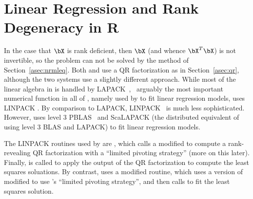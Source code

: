 \chapter{Linear Regression and Rank Degeneracy in R}

In the case that $\bX$ is rank deficient, then $\bX$ (and whence $\bX^T\bX$) is not invertible, so the problem can not be solved by the method of Section~\ref{asec:nrmleq}.  Both  and
 use a QR factorization as in Section~\ref{asec:qr}, although the two systems use a slightly different approach.  While most of the linear algebra in  is handled by
LAPACK~\citep{lug},~ arguably the most important numerical function in all of , namely  used by  to fit linear regression models, uses LINPACK \citep{linpack}.  By comparison to LAPACK,
LINPACK~ is much less sophisticated.  However,
 uses level 3
PBLAS~ and ScaLAPACK (the distributed equivalent of using level 3 BLAS and LAPACK) to fit linear regression models.

The LINPACK routines used by  are , which calls a modified  to compute a rank-revealing
QR factorization
with a ``limited pivoting strategy'' (more on this later).  Finally,  is called to apply the output of the QR factorization to compute the least squares soluations.  By contrast,
 uses a modified  routine, which uses a version of  modified to use 's ``limited pivoting strategy'', and then calls  to fit the least squares solution.

